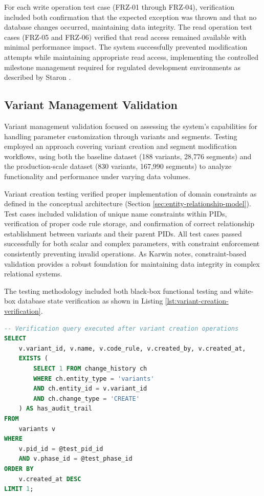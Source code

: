 For each write operation test case (FRZ-01 through FRZ-04), verification included both confirmation that the expected exception was thrown and that no database changes occurred, maintaining data integrity. The read operation test cases (FRZ-05 and FRZ-06) verified that read access remained available with minimal performance impact. The system successfully prevented modification attempts while maintaining appropriate read access, implementing the controlled milestone management required for regulated development environments as described by Staron \cite{staron2021automotive}.

\subsection{Variant Management Validation}
\label{subsec:variant-management-validation}

Variant management validation focused on assessing the system's capabilities for handling parameter customization through variants and segments. Testing employed an approach covering variant creation and segment modification workflows, using both the baseline dataset (188 variants, 28,776 segments) and the production-scale dataset (830 variants, 167,990 segments) to analyze functionality and performance under varying data volumes.

Variant creation testing verified proper implementation of domain constraints as defined in the conceptual architecture (Section \ref{sec:entity-relationship-model}). Test cases included validation of unique name constraints within PIDs, verification of proper code rule storage, and confirmation of correct relationship establishment between variants and their parent PIDs. All test cases passed successfully for both scalar and complex parameters, with constraint enforcement consistently preventing invalid operations. As Karwin \cite{karwin2010sql} notes, constraint-based validation provides a robust foundation for maintaining data integrity in complex relational systems.

The testing methodology included both black-box functional testing and white-box database state verification as shown in Listing \ref{lst:variant-creation-verification}.

\begin{lstlisting}[language=SQL, caption={Variant Creation Verification Query}, label={lst:variant-creation-verification}]
-- Verification query executed after variant creation operations
SELECT 
    v.variant_id, v.name, v.code_rule, v.created_by, v.created_at,
    EXISTS (
        SELECT 1 FROM change_history ch 
        WHERE ch.entity_type = 'variants' 
        AND ch.entity_id = v.variant_id
        AND ch.change_type = 'CREATE'
    ) AS has_audit_trail
FROM 
    variants v
WHERE 
    v.pid_id = @test_pid_id
    AND v.phase_id = @test_phase_id
ORDER BY 
    v.created_at DESC
LIMIT 1;
\end{lstlisting}

